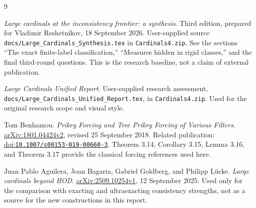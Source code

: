 \documentclass[11pt,letterpaper]{article}
\theoremstyle{definition}
\numberwithin{equation}{section}
\newcommand{\arxiv}[1]{\href{https://arxiv.org/abs/#1}{arXiv:#1}}
\newcommand{\doi}[1]{\href{https://doi.org/#1}{doi:\nolinkurl{#1}}}
\begin{document}
\begin{thebibliography}{9}

\emph{Large cardinals at the inconsistency frontier: a synthesis}.
Third edition, prepared for Vladimir Reshetnikov, 18 September 2026.
User-supplied source \nolinkurl{docs/Large_Cardinals_Synthesis.tex} in \nolinkurl{Cardinals4.zip}.
See the sections ``The exact finite-label classification,'' ``Measures hidden in rigid classes,'' and the final third-round questions. This is the research baseline, not a claim of external publication.

\emph{Large Cardinals Unified Report}.
User-supplied research assessment,
\nolinkurl{docs/Large_Cardinals_Unified_Report.tex}, in \nolinkurl{Cardinals4.zip}.
Used for the original research scope and visual style.

Tom Benhamou.
\emph{Prikry Forcing and Tree Prikry Forcing of Various Filters}.
\arxiv{1801.04424v2}, revised 25 September 2018.
Related publication: \doi{10.1007/s00153-019-00660-3}.
Theorem 3.14, Corollary 3.15, Lemma 3.16, and Theorem 3.17 provide the classical forcing references used here.

Juan Pablo Aguilera, Joan Bagaria, Gabriel Goldberg, and Philipp L\"ucke.
\emph{Large cardinals beyond HOD}.
\arxiv{2509.10254v1}, 12 September 2025.
Used only for the comparison with exacting and ultraexacting consistency strengths, not as a source for the new constructions in this report.

\end{thebibliography}
\end{document}
